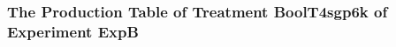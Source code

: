  \begin{frame}
 \fontsize{8pt}{9pt}\selectfont
 \frametitle{ The Production Table of Treatment BoolT4sgp6k of Experiment ExpB }

 \label{ExpBGrammarTable032.tex}  
 \end{frame}

